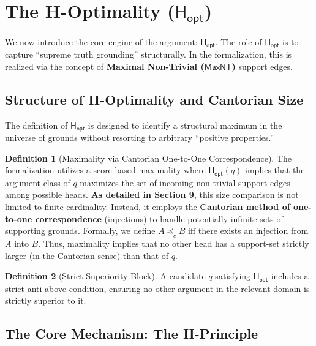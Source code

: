 \documentclass[a4paper, 11pt]{article}
\theoremstyle{plain}
\theoremstyle{definition}
\newtheorem{definition}{Definition}[section]
\newcommand{\Hopt}{\mathsf{H_{opt}}}       %
\begin{document}

\section{The H-Optimality ($\Hopt$)}
\label{sec:h_opt}

We now introduce the core engine of the argument: $\Hopt$. The role of $\Hopt$ is to capture ``supreme truth grounding'' structurally. In the formalization, this is realized via the concept of \textbf{Maximal Non-Trivial ($\mathsf{MaxNT}$)} support edges.

\subsection{Structure of H-Optimality and Cantorian Size}
The definition of $\Hopt$ is designed to identify a structural maximum in the universe of grounds without resorting to arbitrary ``positive properties.''

\begin{definition}[Maximality via Cantorian One-to-One Correspondence]
The formalization utilizes a score-based maximality where $\Hopt(q)$ implies that the argument-class of $q$ maximizes the set of incoming non-trivial support edges among possible heads.
\textbf{As detailed in Section 9}, this size comparison is not limited to finite cardinality. Instead, it employs the \textbf{Cantorian method of one-to-one correspondence} (injections) to handle potentially infinite sets of supporting grounds. Formally, we define $A \preceq_c B$ iff there exists an injection from $A$ into $B$. Thus, maximality implies that no other head has a support-set strictly larger (in the Cantorian sense) than that of $q$.
\end{definition}

\begin{definition}[Strict Superiority Block]
A candidate $q$ satisfying $\Hopt$ includes a strict anti-above condition, ensuring no other argument in the relevant domain is strictly superior to it.
\end{definition}

\subsection{The Core Mechanism: The H-Principle}
\label{sec:h_principle}
\end{document}
